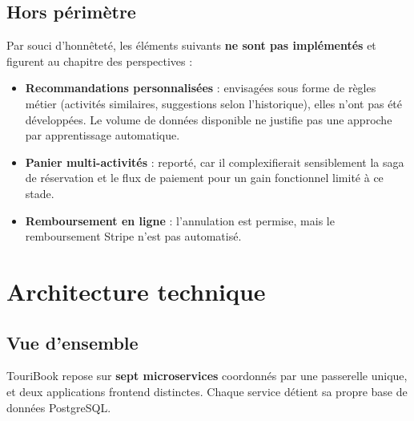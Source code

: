 \documentclass[11pt,a4paper]{report}
\begin{document}
\section{Hors périmètre}

Par souci d'honnêteté, les éléments suivants \textbf{ne sont pas implémentés} et
figurent au chapitre des perspectives :

\begin{itemize}
  \item \textbf{Recommandations personnalisées} : envisagées sous forme de
    règles métier (activités similaires, suggestions selon l'historique), elles
    n'ont pas été développées. Le volume de données disponible ne justifie pas
    une approche par apprentissage automatique.
  \item \textbf{Panier multi-activités} : reporté, car il complexifierait
    sensiblement la saga de réservation et le flux de paiement pour un gain
    fonctionnel limité à ce stade.
  \item \textbf{Remboursement en ligne} : l'annulation est permise, mais le
    remboursement Stripe n'est pas automatisé.
\end{itemize}

\chapter{Architecture technique}

\section{Vue d'ensemble}

TouriBook repose sur \textbf{sept microservices} coordonnés par une passerelle
unique, et deux applications frontend distinctes. Chaque service détient sa
propre base de données PostgreSQL.

\vspace{6pt}
\end{document}
